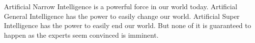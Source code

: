 \documentclass[12pt]{article} %
\begin{document}
Artificial Narrow Intelligence is a powerful force in our world today. Artificial General Intelligence has the power to easily change our world. Artificial Super Intelligence has the power to easily end our world. But none of it is guaranteed to happen as the experts seem convinced is imminent.


\begin{thebibliography}{99} %
 
\end{thebibliography}

\end{document}
